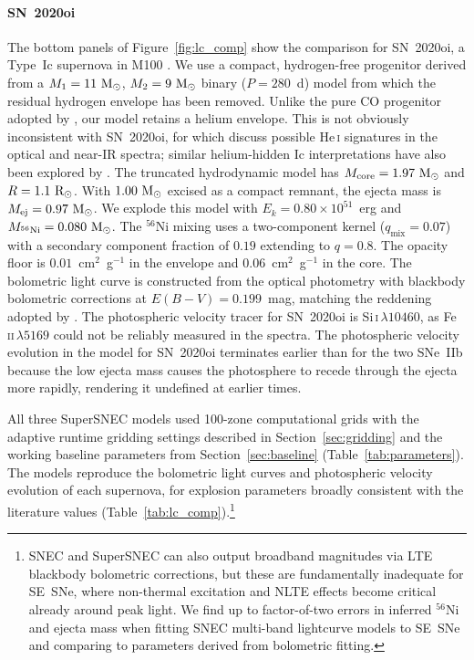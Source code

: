 \documentclass[twocolumn,linenumbers]{aastex701}
\begin{document}
\paragraph{SN~2020oi}
The bottom panels of Figure~\ref{fig:lc_comp} show the comparison for SN~2020oi, a Type~Ic supernova in M100 \citep{Rho2021}. We use a compact, hydrogen-free progenitor derived from a $M_1 = 11~{\rm M}_\odot$, $M_2 = 9~{\rm M}_\odot$ binary ($P = 280$~d) model from which the residual hydrogen envelope has been removed. Unlike the pure CO progenitor adopted by \citet{Rho2021}, our model retains a helium envelope. This is not obviously inconsistent with SN~2020oi, for which \citet{Rho2021} discuss possible He\,\textsc{i} signatures in the optical and near-IR spectra; similar helium-hidden Ic interpretations have also been explored by \citet{Dessart2012}. The truncated hydrodynamic model has $M_\mathrm{core} = 1.97~{\rm M}_\odot$ and $R = 1.1~{\rm R}_\odot$. With $1.00~{\rm M}_\odot$ excised as a compact remnant, the ejecta mass is $M_\mathrm{ej} = 0.97~{\rm M}_\odot$. We explode this model with $E_k = 0.80 \times 10^{51}$~erg and $M_{^{56}\mathrm{Ni}} = 0.080~{\rm M}_\odot$. The $^{56}$Ni mixing uses a two-component kernel ($q_\mathrm{mix} = 0.07$) with a secondary component fraction of $0.19$ extending to $q = 0.8$. The opacity floor is $0.01$~cm$^2$~g$^{-1}$ in the envelope and $0.06$~cm$^2$~g$^{-1}$ in the core. The bolometric light curve is constructed from the \citet{Rho2021} optical photometry with blackbody bolometric corrections at $E(B-V) = 0.199$~mag, matching the reddening adopted by \citet{Rodriguez2024}. The photospheric velocity tracer for SN~2020oi is Si\,\textsc{i}\,$\lambda10460$, as Fe\,\textsc{ii}\,$\lambda5169$ could not be reliably measured in the spectra. The photospheric velocity evolution in the model for SN~2020oi terminates earlier than for the two SNe~IIb because the low ejecta mass causes the photosphere to recede through the ejecta more rapidly, rendering it undefined at earlier times.

All three SuperSNEC models used 100-zone computational grids with the adaptive runtime gridding settings described in Section~\ref{sec:gridding} and the working baseline parameters from Section~\ref{sec:baseline} (Table~\ref{tab:parameters}). The models reproduce the bolometric light curves and photospheric velocity evolution of each supernova, for explosion parameters broadly consistent with the literature values (Table~\ref{tab:lc_comp}).\footnote{SNEC and SuperSNEC can also output broadband magnitudes via LTE blackbody bolometric corrections, but these are fundamentally inadequate for SE~SNe, where non-thermal excitation and NLTE effects become critical already around peak light.  We find up to factor-of-two errors in inferred $^{56}$Ni and ejecta mass when fitting SNEC multi-band lightcurve models to SE~SNe and comparing to parameters derived from bolometric fitting.}
\end{document}
